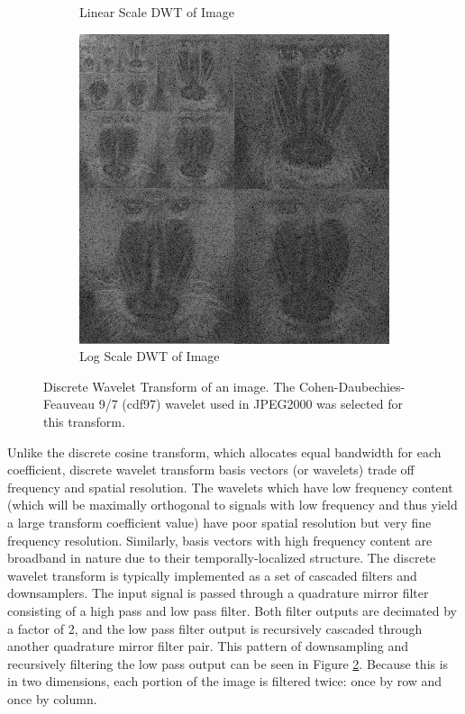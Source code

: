 \documentclass[conference]{IEEEtran}
\begin{document}
\begin{figure}[htbp]
\begin{subfigure}{0.7\columnwidth}
        \caption{Linear Scale DWT of Image}
        \label{fig:linDWTGray}
    \end{subfigure}
    \par\bigskip
    \begin{subfigure}{0.7\columnwidth}
        \includegraphics[width=\textwidth]{images/mandrill_logDWT.png}
        \caption{Log Scale DWT of Image}
        \label{fig:logDWTGray}
    \end{subfigure}
    \caption{Discrete Wavelet Transform of an image. The Cohen-Daubechies-Feauveau 9/7 (cdf97) wavelet used in JPEG2000 was selected for this transform.}
    \label{fig:dwtImage}
\end{figure}

Unlike the discrete cosine transform, which allocates equal bandwidth for each coefficient, discrete wavelet transform basis vectors (or wavelets) trade off frequency and spatial resolution.
The wavelets which have low frequency content (which will be maximally orthogonal to signals with low frequency and thus yield a large transform coefficient value) have poor spatial resolution but very fine frequency resolution.
Similarly, basis vectors with high frequency content are broadband in nature due to their temporally-localized structure.
The discrete wavelet transform is typically implemented as a set of cascaded filters and downsamplers.
The input signal is passed through a quadrature mirror filter consisting of a high pass and low pass filter.
Both filter outputs are decimated by a factor of 2, and the low pass filter output is recursively cascaded through another quadrature mirror filter pair.
This pattern of downsampling and recursively filtering the low pass output can be seen in Figure \ref{fig:logDWTGray}.
Because this is in two dimensions, each portion of the image is filtered twice: once by row and once by column.
\end{document}
